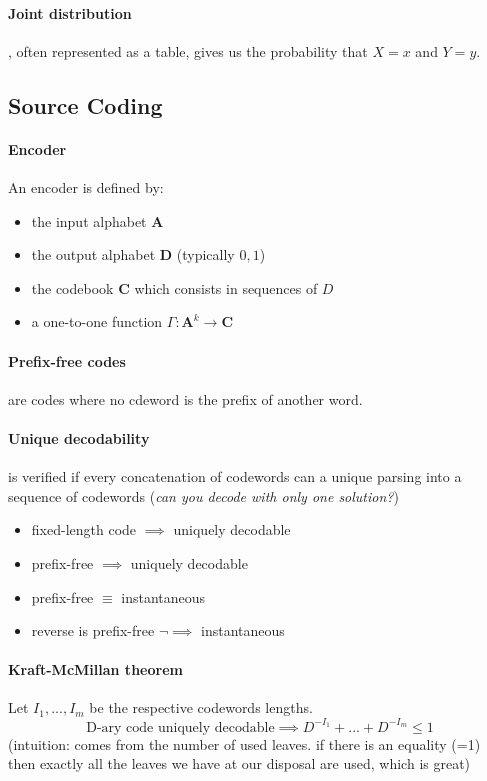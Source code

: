 \documentclass{article}
\begin{document}
\paragraph{Joint distribution}, often represented as a table, gives us the probability that $ X = x $ and $ Y = y $.

\subsection{Source Coding}

\paragraph{Encoder} An encoder is defined by:
\begin{itemize}
    \item the input alphabet $ \mathbf{A} $
    \item the output alphabet $ \mathbf{D} $ (typically $ {0,1} $)
    \item the codebook $ \mathbf{C} $ which consists in sequences of $ D $
    \item a one-to-one function $ \Gamma : \mathbf{A}^k \to \mathbf{C} $
\end{itemize}

\paragraph{Prefix-free codes} are codes where no cdeword is the prefix of another word.

\paragraph{Unique decodability} is verified if every concatenation of codewords can a unique parsing into a sequence of codewords (\textit{can you decode with only one solution?})

\begin{itemize}
    \item fixed-length code $ \implies $ uniquely decodable
    \item prefix-free $ \implies $ uniquely decodable
    \item prefix-free $ \equiv $ instantaneous
    \item reverse is prefix-free $ \neg \implies $ instantaneous
\end{itemize}

\paragraph{Kraft-McMillan theorem} Let $ I_1, ..., I_m $ be the respective codewords lengths.\\
\[ \text{D-ary code uniquely decodable} \implies D^{-I_1} + ... + D^{-I_m} \leq 1 \]
(intuition: comes from the number of used leaves. if there is an equality (=1) then exactly all the leaves we have at our disposal are used, which is great)
\end{document}
